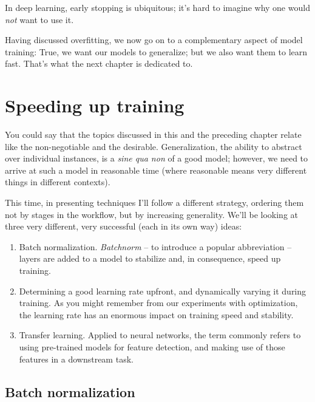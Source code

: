 \documentclass[
  letterpaper,
]{krantz}
\begin{document}
In deep learning, early stopping is ubiquitous; it's hard to imagine why
one would \emph{not} want to use it.

Having discussed overfitting, we now go on to a complementary aspect of
model training: True, we want our models to generalize; but we also want
them to learn fast. That's what the next chapter is dedicated to.

\hypertarget{sec:training_efficiency}{%
\chapter{Speeding up training}\label{sec:training_efficiency}}

You could say that the topics discussed in this and the preceding
chapter relate like the non-negotiable and the desirable.
Generalization, the ability to abstract over individual instances, is a
\emph{sine qua non} of a good model; however, we need to arrive at such
a model in reasonable time (where reasonable means very different things
in different contexts).

This time, in presenting techniques I'll follow a different strategy,
ordering them not by stages in the workflow, but by increasing
generality. We'll be looking at three very different, very successful
(each in its own way) ideas:

\begin{enumerate}
\def\labelenumi{\arabic{enumi}.}
\item
  Batch normalization. \emph{Batchnorm} -- to introduce a popular
  abbreviation -- layers are added to a model to stabilize and, in
  consequence, speed up training.
\item
  Determining a good learning rate upfront, and dynamically varying it
  during training. As you might remember from our experiments with
  optimization, the learning rate has an enormous impact on training
  speed and stability.
\item
  Transfer learning. Applied to neural networks, the term commonly
  refers to using pre-trained models for feature detection, and making
  use of those features in a downstream task.
\end{enumerate}

\hypertarget{batch-normalization}{%
\section{\texorpdfstring{Batch
normalization}{Batch normalization}}\label{batch-normalization}}
\end{document}
